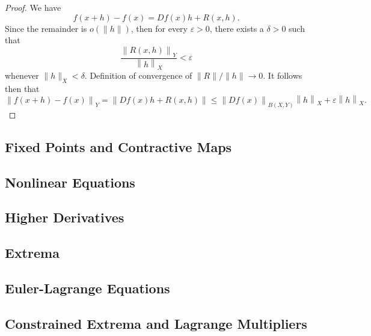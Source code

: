\documentclass[letterpaper,twoside,12pt]{article}
\theoremstyle{mystyle}
\newcommand{\cg}{\color{gray}}
\newcommand{\cbk}{\color{black}}
\newcommand{\ve}{\varepsilon}
\begin{document}
  \begin{proof}
    We have 
    \begin{equation}
      f\left( {x + h} \right) - f\left( x \right) = Df\left( x \right)h + R\left( {x,h} \right).
    \end{equation}
    Since the remainder is $o(\|h\|)$, then for every $\ve > 0$, there exists a $\delta > 0$ such that 
    \begin{equation}
      \frac{{{{\left\| {R\left( {x,h} \right)} \right\|}_Y}}}{{{{\left\| h \right\|}_X}}} < \ve
    \end{equation}
    whenever $\|h\|_X < \delta$. \cg Definition of convergence of $\|R\| /\|h\| \to 0$. \cbk It follows then that 
    \begin{equation}
      {\left\| {f\left( {x + h} \right) - f\left( x \right)} \right\|_Y} = \left\| {Df\left( x \right)h + R\left( {x,h} \right)} \right\| \leqslant {\left\| {Df\left( x \right)} \right\|_{B\left( {X,Y} \right)}}{\left\| h \right\|_X} + \varepsilon {\left\| h \right\|_X}.
    \end{equation}
  \end{proof}


\subsection{Fixed Points and Contractive Maps}



\subsection{Nonlinear Equations}





\subsection{Higher Derivatives}





\subsection{Extrema}





\subsection{Euler-Lagrange Equations}





\subsection{Constrained Extrema and Lagrange Multipliers}
\end{document}
